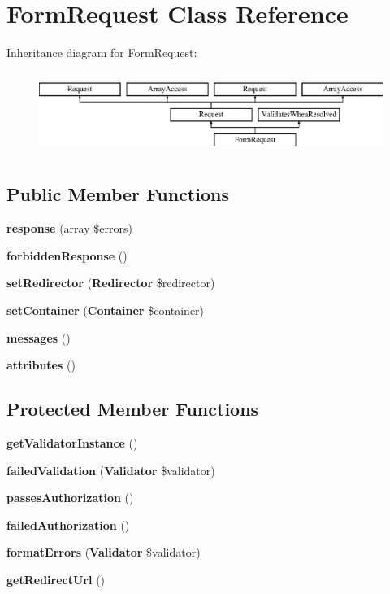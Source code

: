 \section{Form\+Request Class Reference}
\label{class_illuminate_1_1_foundation_1_1_validation_1_1_form_request}
Inheritance diagram for Form\+Request\+:\begin{figure}[H]
\begin{center}
\leavevmode
\includegraphics[height=2.692308cm]{class_illuminate_1_1_foundation_1_1_validation_1_1_form_request}
\end{center}
\end{figure}
\subsection*{Public Member Functions}
\begin{DoxyCompactItemize}
\item 
{\bf response} (array \$errors)
\item 
{\bf forbidden\+Response} ()
\item 
{\bf set\+Redirector} ({\bf Redirector} \$redirector)
\item 
{\bf set\+Container} ({\bf Container} \$container)
\item 
{\bf messages} ()
\item 
{\bf attributes} ()
\end{DoxyCompactItemize}
\subsection*{Protected Member Functions}
\begin{DoxyCompactItemize}
\item 
{\bf get\+Validator\+Instance} ()
\item 
{\bf failed\+Validation} ({\bf Validator} \$validator)
\item 
{\bf passes\+Authorization} ()
\item 
{\bf failed\+Authorization} ()
\item 
{\bf format\+Errors} ({\bf Validator} \$validator)
\item 
{\bf get\+Redirect\+Url} ()
\end{DoxyCompactItemize}
